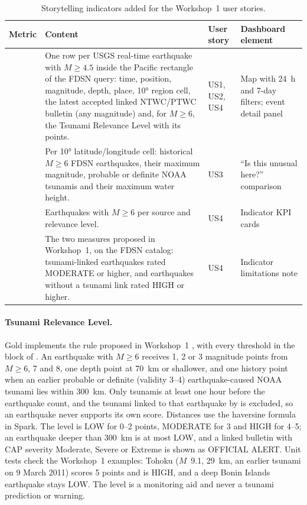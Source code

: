 \documentclass[a4paper,11pt,oneside]{book}
\begin{document}
\begin{table}[!htbp]
\centering
\small
\begin{tabularx}{\textwidth}{@{}L{3cm}YL{1.6cm}L{2.2cm}@{}}
\toprule
Metric & Content & User story & Dashboard element \\
\midrule
{} & One row per USGS real-time earthquake with $M\geq4.5$ inside the Pacific rectangle of the FDSN query: time, position, magnitude, depth, place, 10° region cell, the latest accepted linked NTWC/PTWC bulletin (any magnitude) and, for $M\geq6$, the Tsunami Relevance Level with its points. & US1, US2, US4 & Map with 24~h and 7-day filters; event detail panel \\
 & Per 10° latitude/longitude cell: historical $M\geq6$ FDSN earthquakes, their maximum magnitude, probable or definite NOAA tsunamis and their maximum water height. & US3 & ``Is this unusual here?'' comparison \\
 & Earthquakes with $M\geq6$ per source and relevance level. & US4 & Indicator KPI cards \\
 & The two measures proposed in Workshop~1, on the FDSN catalog: tsunami-linked earthquakes rated MODERATE or higher, and earthquakes without a tsunami link rated HIGH or higher. & US4 & Indicator limitations note \\
\bottomrule
\end{tabularx}
\caption{Storytelling indicators added for the Workshop~1 user stories.}
\label{tab:story-us}
\end{table}

\paragraph{Tsunami Relevance Level.} Gold implements the rule proposed in Workshop~1 \cite{workshop1}, with every threshold in the  block of . An earthquake with $M\geq6$ receives 1, 2 or 3 magnitude points from $M\geq6$, 7 and 8, one depth point at 70~km or shallower, and one history point when an earlier probable or definite (validity 3--4) earthquake-caused NOAA tsunami lies within 300~km. Only tsunamis at least one hour before the earthquake count, and the tsunami linked to that earthquake by  is excluded, so an earthquake never supports its own score. Distances use the haversine formula in Spark. The level is LOW for 0--2 points, MODERATE for 3 and HIGH for 4--5; an earthquake deeper than 300~km is at most LOW, and a linked bulletin with CAP severity Moderate, Severe or Extreme is shown as OFFICIAL ALERT. Unit tests check the Workshop~1 examples: Tohoku ($M$~9.1, 29~km, an earlier tsunami on 9 March 2011) scores 5 points and is HIGH, and a deep Bonin Islands earthquake stays LOW. The level is a monitoring aid and never a tsunami prediction or warning.
\end{document}
